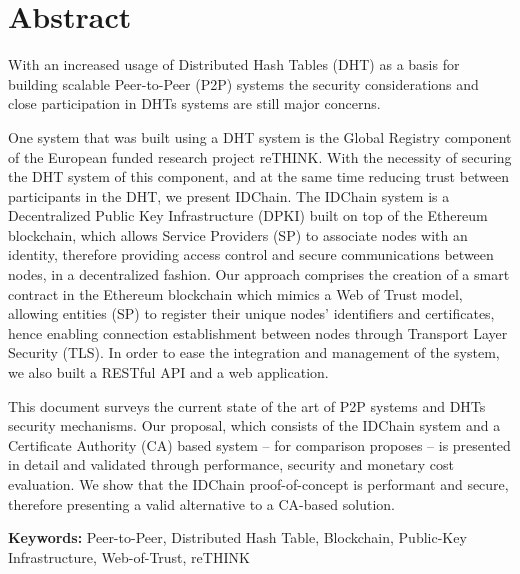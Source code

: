 \chapter*{Abstract}


With an increased usage of Distributed Hash Tables (DHT) as a basis for building scalable Peer-to-Peer (P2P) systems the security considerations and close participation in DHTs systems are still major concerns.

One system that was built using a DHT system is the Global Registry component of the European funded research project reTHINK.
With the necessity of securing the DHT system of this component, and at the same time reducing trust between participants in the DHT, we present IDChain.
The IDChain system is a Decentralized Public Key Infrastructure (DPKI) built on top of the Ethereum blockchain, which allows Service Providers (SP) to associate nodes with an identity, therefore providing access control and secure communications between nodes, in a decentralized fashion.
Our approach comprises the creation of a smart contract in the Ethereum blockchain which mimics a Web of Trust model, allowing entities (SP) to register their unique nodes' identifiers and certificates, hence enabling connection establishment between nodes through Transport Layer Security (TLS).
In order to ease the integration and management of the system, we also built a RESTful API and a web application.

This document surveys the current state of the art of P2P systems and DHTs security mechanisms.
Our proposal, which consists of the IDChain system and a Certificate Authority (CA) based system – for comparison proposes – is presented in detail and validated through performance, security and monetary cost evaluation.
We show that the IDChain proof-of-concept is performant and secure, therefore presenting a valid alternative to a CA-based solution.

\vspace{1cm}

\textbf{\Large Keywords:} Peer-to-Peer, Distributed Hash Table, Blockchain, Public-Key Infrastructure, Web-of-Trust, reTHINK

\cleardoublepage
